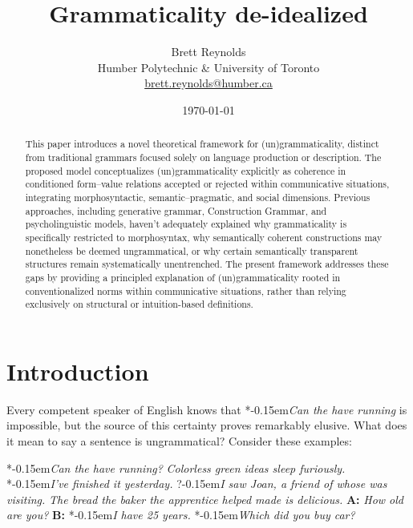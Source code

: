 \documentclass[12pt,letterpaper]{article}
\title{Grammaticality de-idealized}
\author{Brett Reynolds \orcidlink{0000-0003-0073-7195}\\
  Humber Polytechnic \& University of Toronto\\
  \href{mailto:brett.reynolds@humber.ca}{brett.reynolds@humber.ca}}
\date{\today}
\newcommand{\mention}[1]{\textit{#1}}
\newcommand{\judgesep}{\kern-0.15em}
\newcommand{\ungram}[1]{*\judgesep#1}
\newcommand{\marg}[1]{?\judgesep#1}
\begin{document}
\maketitle

\begin{abstract}
    This paper introduces a novel theoretical framework for (un)gram\-maticality, distinct from traditional grammars focused solely on language production or description. The proposed model conceptualizes (un)grammaticality explicitly as coherence in conditioned form--value relations accepted or rejected within communicative situations, integrating morphosyntactic, semantic--pragmatic, and social dimensions. Previous approaches, including generative grammar, Construction Grammar, and psycholinguistic models, haven't adequately explained why grammaticality is specifically restricted to morphosyntax, why semantically coherent constructions may nonetheless be deemed ungrammatical, or why certain semantically transparent structures remain systematically unentrenched. The present framework addresses these gaps by providing a principled explanation of (un)grammaticality rooted in conventionalized norms within communicative situations, rather than relying exclusively on structural or intuition-based definitions.
\end{abstract}


\newpage
\section*{Introduction}

Every competent speaker of English knows that \ungram{\mention{Can the have running}} is impossible, but the source of this certainty proves remarkably elusive. What does it mean to say a sentence is ungrammatical? Consider these examples:

\ea \label{ex:starting-stars}
\ea\label{ex:nonsense} \ungram{\mention{Can the have running?}}
\ex\label{ex:colorless-grammatica} \mention{Colorless green ideas sleep furiously.} \autocite{chomsky1957}
\ex\label{ex:tense} \ungram{\mention{I've finished it yesterday.}}
\ex\marg{\mention{I saw Joan, a friend of whose was visiting.}}\label{ex:whose} 
\ex\label{ex:center} \mention{The bread the baker the apprentice helped made is delicious.}
\ex\label{ex:age} \textbf{A:} \mention{How old are you?} \textbf{B:} \ungram{\mention{I have 25 years.}}
\ex\label{ex:lbe} \ungram{\mention{Which did you buy car?}}
\z\z
\end{document}

